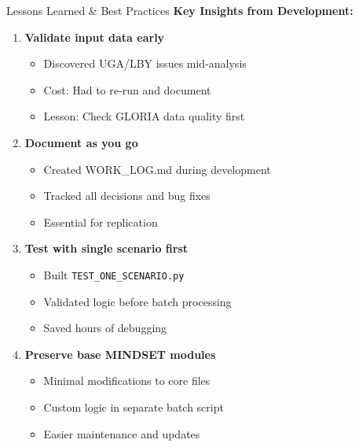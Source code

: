 \documentclass[10pt]{beamer}
\begin{document}
\begin{frame}{Lessons Learned \& Best Practices}
\textbf{Key Insights from Development:}

\vspace{0.3cm}

\begin{enumerate}
    \item \textbf{Validate input data early}
    \begin{itemize}
        \item Discovered UGA/LBY issues mid-analysis
        \item Cost: Had to re-run and document
        \item Lesson: Check GLORIA data quality first
    \end{itemize}

    \vspace{0.2cm}

    \item \textbf{Document as you go}
    \begin{itemize}
        \item Created WORK\_LOG.md during development
        \item Tracked all decisions and bug fixes
        \item Essential for replication
    \end{itemize}

    \vspace{0.2cm}

    \item \textbf{Test with single scenario first}
    \begin{itemize}
        \item Built \texttt{TEST\_ONE\_SCENARIO.py}
        \item Validated logic before batch processing
        \item Saved hours of debugging
    \end{itemize}

    \vspace{0.2cm}

    \item \textbf{Preserve base MINDSET modules}
    \begin{itemize}
        \item Minimal modifications to core files
        \item Custom logic in separate batch script
        \item Easier maintenance and updates
    \end{itemize}
\end{enumerate}

\end{frame}
\end{document}
